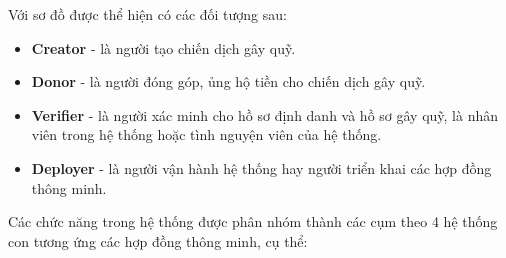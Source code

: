 \documentclass[../main-report.tex]{subfiles}
\begin{document}
Với sơ đồ được thể hiện có các đối tượng sau:

\begin{itemize}
\item \textbf{Creator} - là người tạo chiến dịch gây quỹ.
\item \textbf{Donor} - là người đóng góp, ủng hộ tiền cho chiến dịch gây quỹ.
\item \textbf{Verifier} - là người xác minh cho hồ sơ định danh và hồ sơ gây quỹ, là nhân viên trong hệ thống hoặc tình nguyện viên của hệ thống.
\item \textbf{Deployer} - là người vận hành hệ thống hay người triển khai các hợp đồng thông minh.
\end{itemize}

Các chức năng trong hệ thống được phân nhóm thành các cụm theo 4 hệ thống con tương ứng các hợp đồng thông minh, cụ thể:
\end{document}
